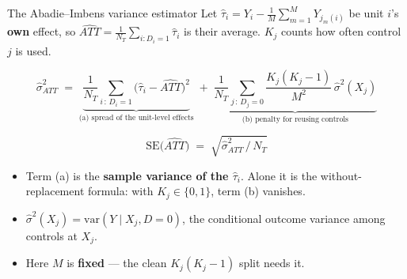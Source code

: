\documentclass[
  11pt,
  ignorenonframetext,
  aspectratio=169,
]{beamer}
\providecommand{\tightlist}{%
  \setlength{\itemsep}{0pt}\setlength{\parskip}{0pt}}
\begin{document}
\begin{frame}{The Abadie--Imbens variance estimator}
\protect{}\label{the-abadieimbens-variance-estimator}
Let \(\hat\tau_i = Y_i - \frac{1}{M}\sum_{m=1}^{M} Y_{j_m(i)}\) be unit
\(i\)'s \textbf{own} effect, so
\(\widehat{ATT} = \frac{1}{N_T}\sum_{i:D_i=1}\hat\tau_i\) is their
average. \(K_j\) counts how often control \(j\) is used.

\[
\hat\sigma^2_{ATT} \;=\;
\underbrace{\frac{1}{N_T}\sum_{i\,:\,D_i=1}\big(\hat\tau_i - \widehat{ATT}\big)^2}_{\text{(a) spread of the unit-level effects}}
\;+\;
\underbrace{\frac{1}{N_T}\sum_{j\,:\,D_j=0}\frac{K_j(K_j-1)}{M^2}\,\hat\sigma^2(X_j)}_{\text{(b) penalty for reusing controls}}
\]

\[
\mathrm{SE}\big(\widehat{ATT}\big) \;=\; \sqrt{\hat\sigma^2_{ATT} \,\big/\, N_T}
\]

\begin{itemize}
\tightlist
\item
  Term (a) is the \textbf{sample variance of the \(\hat\tau_i\)}. Alone
  it is the without-replacement formula: with \(K_j \in \{0,1\}\), term
  (b) vanishes.
\item
  \(\hat\sigma^2(X_j) = \mathrm{var}(Y \mid X_j, D{=}0)\), the
  conditional outcome variance among controls at \(X_j\).
\item
  Here \(M\) is \textbf{fixed} --- the clean \(K_j(K_j{-}1)\) split
  needs it.
\end{itemize}
\end{frame}
\end{document}

